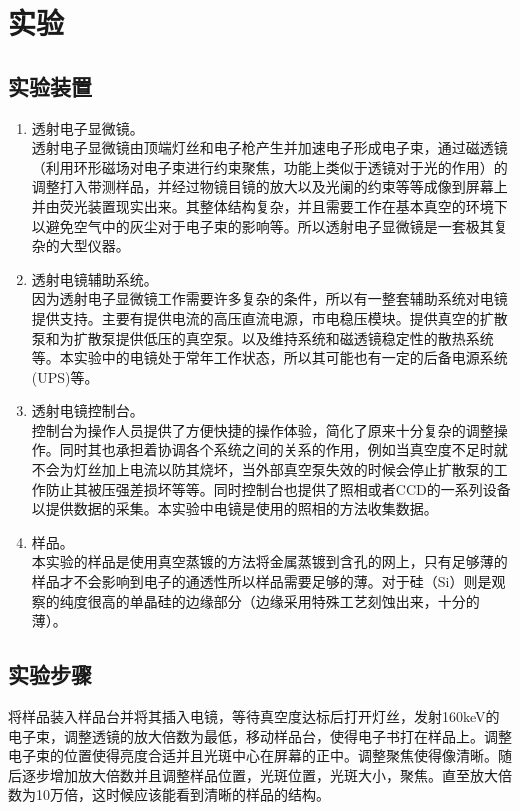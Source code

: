 \documentclass[aps,pre,12pt,preprint,onecolumn,showpacs,showkeys,UTF8]{revtex4-1}
\begin{document}
\section{实验}
\subsection{实验装置}
\begin{enumerate}
	\item 透射电子显微镜。\\透射电子显微镜由顶端灯丝和电子枪产生并加速电子形成电子束，通过磁透镜（利用环形磁场对电子束进行约束聚焦，功能上类似于透镜对于光的作用）的调整打入带测样品，并经过物镜目镜的放大以及光阑的约束等等成像到屏幕上并由荧光装置现实出来。其整体结构复杂，并且需要工作在基本真空的环境下以避免空气中的灰尘对于电子束的影响等。所以透射电子显微镜是一套极其复杂的大型仪器。
	\item 透射电镜辅助系统。\\ 因为透射电子显微镜工作需要许多复杂的条件，所以有一整套辅助系统对电镜提供支持。主要有提供电流的高压直流电源，市电稳压模块。提供真空的扩散泵和为扩散泵提供低压的真空泵。以及维持系统和磁透镜稳定性的散热系统等。本实验中的电镜处于常年工作状态，所以其可能也有一定的后备电源系统(UPS)等。
	\item 透射电镜控制台。\\控制台为操作人员提供了方便快捷的操作体验，简化了原来十分复杂的调整操作。同时其也承担着协调各个系统之间的关系的作用，例如当真空度不足时就不会为灯丝加上电流以防其烧坏，当外部真空泵失效的时候会停止扩散泵的工作防止其被压强差损坏等等。同时控制台也提供了照相或者CCD的一系列设备以提供数据的采集。本实验中电镜是使用的照相的方法收集数据。
	\item 样品。\\本实验的样品是使用真空蒸镀的方法将金属蒸镀到含孔的网上，只有足够薄的样品才不会影响到电子的通透性所以样品需要足够的薄。对于硅（Si）则是观察的纯度很高的单晶硅的边缘部分（边缘采用特殊工艺刻蚀出来，十分的薄）。
\end{enumerate}

\subsection{实验步骤}

将样品装入样品台并将其插入电镜，等待真空度达标后打开灯丝，发射160keV的电子束，调整透镜的放大倍数为最低，移动样品台，使得电子书打在样品上。调整电子束的位置使得亮度合适并且光斑中心在屏幕的正中。调整聚焦使得像清晰。随后逐步增加放大倍数并且调整样品位置，光斑位置，光斑大小，聚焦。直至放大倍数为10万倍，这时候应该能看到清晰的样品的结构。
\end{document}
